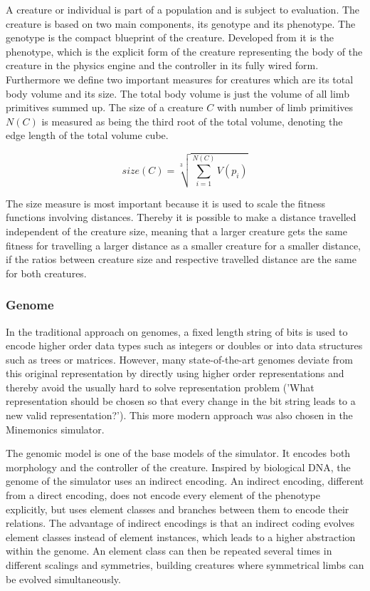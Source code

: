 \documentclass[main]{subfiles}
\begin{document}
A creature or individual is part of a population and is subject to evaluation. The creature is based on two main components, its genotype and its phenotype. The genotype is the compact blueprint of the creature. Developed from it is the phenotype, which is the explicit form of the creature representing the body of the creature in the physics engine and the controller in its fully wired form. Furthermore we define two important measures for creatures which are its total body volume and its size. The total body volume is just the volume of all limb primitives summed up. The size of a creature \(C\) with number of limb primitives \(N(C)\) is measured as being the third root of the total volume, denoting the edge length of the total volume cube. 

\[size(C) = \sqrt[3]{\sum\limits^{N(C)}_{i=1} V(p_i)}\]

The size measure is most important because it is used to scale the fitness functions involving distances. Thereby it is possible to make a distance travelled independent of the creature size, meaning that a larger creature gets the same fitness for travelling a larger distance as a smaller creature for a smaller distance, if the ratios between creature size and respective travelled distance are the same for both creatures.

\subsubsection{Genome}

In the traditional approach on genomes, a fixed length string of bits is used to encode higher order data types such as integers or doubles or into data structures such as trees or matrices. However, many state-of-the-art genomes deviate from this original representation by directly using higher order representations and thereby avoid the usually hard to solve representation problem ('What representation should be chosen so that every change in the bit string leads to a new valid representation?'). This more modern approach was also chosen in the Minemonics simulator.

The genomic model is one of the base models of the simulator. It encodes both morphology and the controller of the creature. Inspired by biological DNA, the genome of the simulator uses an indirect encoding. An indirect encoding, different from a direct encoding, does not encode every element of the phenotype explicitly, but uses element classes and branches between them to encode their relations. The advantage of indirect encodings is that an indirect coding evolves element classes instead of element instances, which leads to a higher abstraction within the genome. An element class can then be repeated several times in different scalings and symmetries, building creatures where symmetrical limbs can be evolved simultaneously.
\end{document}
